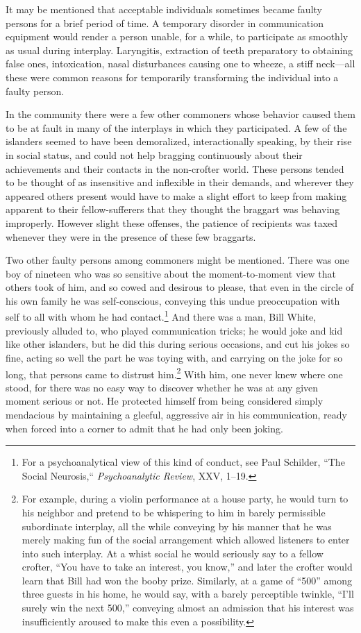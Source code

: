 \documentclass[twoside,symmetric,nobib,justified]{tufte-book}
\begin{document}
It may be mentioned that acceptable individuals sometimes became faulty
persons for a brief period of time. A temporary disorder in
communication equipment would render a person unable, for a while, to
participate as smoothly as usual during interplay. Laryngitis,
extraction of teeth preparatory to obtaining false ones, intoxication,
nasal disturbances causing one to wheeze, a stiff neck---all these were
common reasons for temporarily transforming the individual into a faulty
person.

In the community there were a few other commoners whose behavior caused
them to be at fault in many of the interplays in which they
participated. A few of the islanders seemed to have been demoralized,
interactionally speaking, by their rise in social status, and could not
help bragging continuously about their achievements and their contacts
in the non-crofter world. These persons tended to be thought of as
insensitive and inflexible in their demands, and wherever they appeared
others present would have to make a slight effort to keep from making
apparent to their fellow-sufferers that they thought the braggart was
behaving improperly. However slight these offenses, the patience of
recipients was taxed whenever they were in the presence of these few
braggarts.

Two other faulty persons among commoners might be mentioned. There was
one boy of nineteen who was so sensitive about the moment-to-moment view
that others took of him, and so cowed and desirous to please, that even
in the circle of his own family he was self-conscious, conveying this
undue preoccupation with self to all with whom he had
contact.\footnote{For a psychoanalytical view of this kind of conduct,
  see Paul Schilder, ``The Social Neurosis,`` \emph{Psychoanalytic Review},
  XXV, 1--19.} And there was a man, Bill White, previously alluded to,
who played communication tricks; he would joke and kid like other
islanders, but he did this during serious occasions, and cut his jokes
so fine, acting so well the part he was toying with, and carrying on the
joke for so long, that persons came to distrust him.\footnote{For
  example, during a violin performance at a house party, he would turn
  to his neighbor and pretend to be whispering to him in barely
  permissible subordinate interplay, all the while conveying by his
  manner that he was merely making fun of the social arrangement which
  allowed listeners to enter into such interplay. At a whist social he
  would seriously say to a fellow crofter, ``You have to take an
  interest, you know,'' and later the crofter would learn that Bill had
  won the booby prize. Similarly, at a game of ``500'' among three
  guests in his home, he would say, with a barely perceptible twinkle,
  ``I'll surely win the next 500,'' conveying almost an admission that
  his interest was insufficiently aroused to make this even a
  possibility.} With him, one never knew where one stood, for there was
no easy way to discover whether he was at any given moment serious or
not. He protected himself from being considered simply mendacious by
maintaining a gleeful, aggressive air in his communication, ready when
forced into a corner to admit that he had only been joking.
\end{document}
